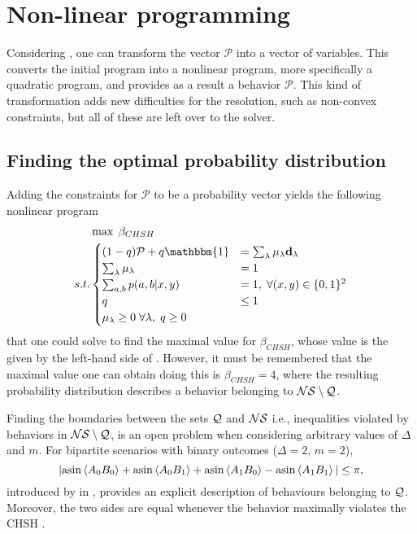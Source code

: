 \section{Non-linear programming}\label{sec:non-linear}

Considering , one can transform the vector
$\mathcal P$ into a vector of variables. This converts the initial program into 
a nonlinear program, more specifically a quadratic program, and provides as a result a behavior $\mathcal P$. This kind of transformation adds new 
difficulties for the resolution, such as non-convex constraints, but all of these 
are left over to the solver.

\subsection{Finding the optimal probability distribution}

Adding the constraints for $\mathcal P$
to be a probability vector yields the following nonlinear program
\begin{equation} \label{eq:primal-nl}
	\begin{aligned}
			  & \max \; \beta_{CHSH}\\
		s.t.  &
		\begin{cases}
			(1-q) \mathcal P + q \mathbbm{1}
                & = \sum_\lambda \mu_\lambda \mathbf{d}_\lambda \\
			\sum_\lambda \mu_\lambda & = 1 \\
            \sum_{a,b} p(a,b|x,y) & = 1, \; \forall (x,y) \in \{0,1\}^2 \\
			q & \leq 1 \\
		    \mu_\lambda \geq 0 \; \forall \lambda, \; q \geq 0
		\end{cases}
	\end{aligned}
\end{equation}
that one could solve to find the maximal value for $\beta_{CHSH}$, whose value is
the given by the left-hand side of . However, 
it must be remembered that the maximal value one can obtain doing this is
$\beta_{CHSH} = 4$, where the resulting probability distribution describes a 
behavior belonging to $\mathcal{NS} \setminus \mathcal{Q}$.

Finding the boundaries between the sets $\mathcal{Q}$ and $\mathcal{NS}$ i.e., inequalities
violated by behaviors in $\mathcal{NS} \setminus \mathcal{Q} $, is an open problem when
considering arbitrary values of $\Delta$ and $m$. For bipartite scenarios with
binary outcomes ($\Delta = 2$, $m = 2$), 
\begin{equation} \label{eq:bound-ns-q}
    | \text{asin} \braket{A_0 B_0}
    + \text{asin} \braket{A_0 B_1}
    + \text{asin} \braket{A_1 B_0}
    - \text{asin} \braket{A_1 B_1} | \leq \pi,
\end{equation}
introduced by \citeauthor{Masanes2003NecessaryAS} in \cite{Masanes2003NecessaryAS}, 
provides an explicit description of behaviours
belonging to $\mathcal{Q}$. Moreover, the two sides are equal whenever the behavior
maximally violates the CHSH .

